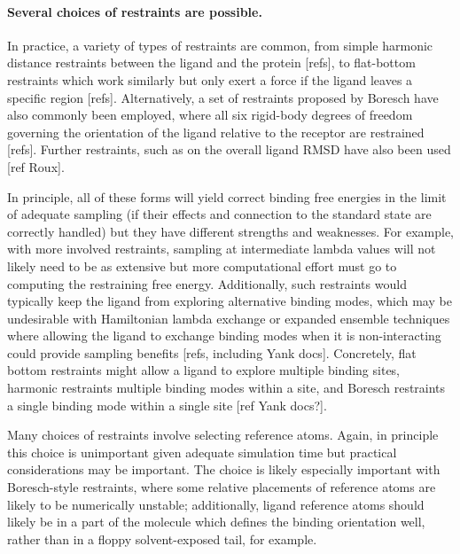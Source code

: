 \documentclass[9pt,bestpractices]{livecoms}
\begin{document}
\paragraph{Several choices of restraints are possible.}
In practice, a variety of types of restraints are common, from simple harmonic distance restraints between the ligand and the protein [refs], to flat-bottom restraints which work similarly but only exert a force if the ligand leaves a specific region [refs].
Alternatively, a set of restraints proposed by Boresch have also commonly been employed, where all six rigid-body degrees of freedom governing the orientation of the ligand relative to the receptor are restrained [refs].
Further restraints, such as on the overall ligand RMSD have also been used [ref Roux].

In principle, all of these forms will yield correct binding free energies in the limit of adequate sampling (if their effects and connection to the standard state are correctly handled) but they have different strengths and weaknesses.
For example, with more involved restraints, sampling at intermediate lambda values will not likely need to be as extensive but more computational effort must go to computing the restraining free energy.
Additionally, such restraints would typically keep the ligand from exploring alternative binding modes, which may be undesirable with Hamiltonian lambda exchange or expanded ensemble techniques where allowing the ligand to exchange binding modes when it is non-interacting could provide sampling benefits [refs, including Yank docs].
Concretely, flat bottom restraints might allow a ligand to explore multiple binding sites, harmonic restraints multiple binding modes within a site, and Boresch restraints a single binding mode within a single site [ref Yank docs?].

Many choices of restraints involve selecting reference atoms.
Again, in principle this choice is unimportant given adequate simulation time but practical considerations may be important.
The choice is likely especially important with Boresch-style restraints, where some relative placements of reference atoms are likely to be numerically unstable; additionally, ligand reference atoms should likely be in a part of the molecule which defines the binding orientation well, rather than in a floppy solvent-exposed tail, for example.
\end{document}

